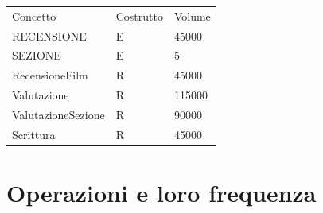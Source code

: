 \documentclass[a4paper,12pt]{report}
\begin{document}
	\begin{table}[H]
		\centering
		\begin{tabular}{|lll|}
			\hline
			\rowcolor[HTML]{FFCE93} 
			\multicolumn{3}{|l|}{\cellcolor[HTML]{FFCE93}Recensioni} \\ \hline
			\rowcolor[HTML]{CBCEFB} 
			Concetto              & Costrutto        & Volume        \\ \hline
			RECENSIONE            & E                & 45000         \\ \hline
			SEZIONE				  & E				 & 5			 \\ \hline
			RecensioneFilm        & R                & 45000         \\ \hline
			Valutazione           & R                & 115000        \\ \hline
			ValutazioneSezione    & R				 & 90000		 \\ \hline
			Scrittura             & R                & 45000         \\ \hline
		\end{tabular}
	\end{table}
	\section{Operazioni e loro frequenza}
\end{document}
